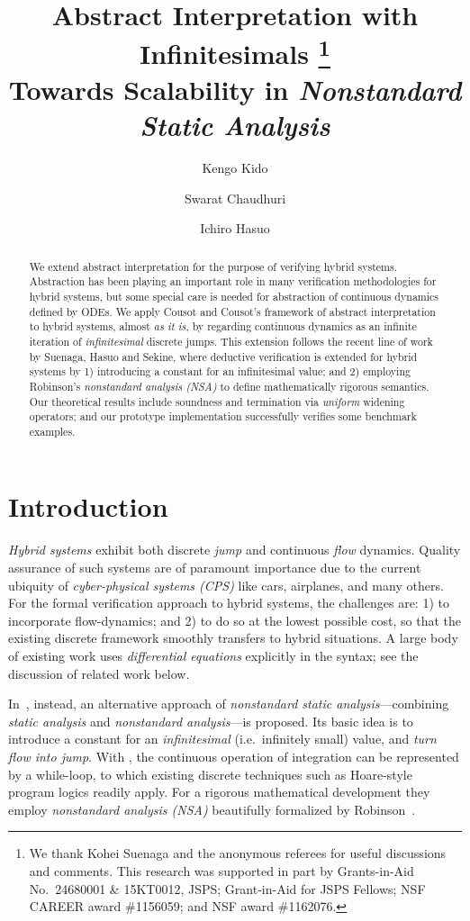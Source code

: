 \documentclass[envcountsect,orivec]{llncs} \pdfoutput=1
\title{Abstract Interpretation with Infinitesimals
\thanks{
We thank Kohei Suenaga and the anonymous referees 
for useful discussions and comments.
This research was supported in part by Grants-in-Aid No.\ 24680001 \& 15KT0012,  JSPS; Grant-in-Aid for JSPS Fellows; NSF CAREER award \#1156059; and NSF award \#1162076.
}
\\
{\large Towards Scalability in \emph{Nonstandard Static Analysis}}
}
\author{
  Kengo Kido \inst{1, 2}
  \and
  Swarat Chaudhuri \inst{3}
  \and
  Ichiro Hasuo \inst{1}
}
\institute{
  University of Tokyo, Japan
  \and
  JSPS Research Fellow
  \and
  Rice University, USA
  }
\theoremstyle{definition}
\begin{document}
\maketitle

  \begin{abstract}
We extend abstract interpretation for the purpose of verifying hybrid systems.
Abstraction has been playing an important role in many verification methodologies for hybrid systems, but
some special care is needed for abstraction of continuous dynamics defined by ODEs.
We apply Cousot and Cousot's framework of abstract interpretation to
   hybrid systems, almost \emph{as it is}, by regarding continuous
   dynamics as an infinite iteration of \emph{infinitesimal} discrete jumps.
This extension follows the recent line of work by Suenaga, Hasuo and Sekine, where deductive verification is extended for hybrid systems by 1) introducing a constant  for an
  infinitesimal value; and 2) employing Robinson's \emph{nonstandard
  analysis (NSA)} to define mathematically rigorous semantics.
 Our theoretical results include soundness and termination via
 \emph{uniform} widening operators; and our prototype implementation
 successfully verifies some benchmark examples.


  \end{abstract}

\nocite{NSAI}

\section{Introduction}\label{sec:introduction}
\emph{Hybrid systems}  exhibit both discrete \emph{jump}
 and continuous  \emph{flow} dynamics. Quality assurance of such systems
 are of paramount importance due to the current ubiquity of
 \emph{cyber-physical systems (CPS)} like cars, airplanes, and many
 others.  
 For the formal verification approach to hybrid systems, the challenges are: 1) to incorporate
 flow-dynamics; and 2) to do so at the lowest possible cost, so that the
 existing discrete framework smoothly transfers to hybrid situations.  A large
 body of existing work uses \emph{differential equations} explicitly in the
 syntax; see the discussion of related work below.

In~\cite{Suenaga2011}, instead, an alternative approach of
\emph{nonstandard static analysis}---combining \emph{static analysis}
and \emph{nonstandard analysis}---is proposed. Its basic idea is
to introduce a constant
 for an \emph{infinitesimal} (i.e.\ infinitely small) value, and
\emph{turn flow into jump}. With , the continuous operation of
integration can be represented by a while-loop, to which
existing discrete techniques such as Hoare-style program logics readily
apply. For a rigorous mathematical development they employ
\emph{nonstandard analysis (NSA)} beautifully formalized by
Robinson~\cite{Robinson1966}. 
\end{document}
